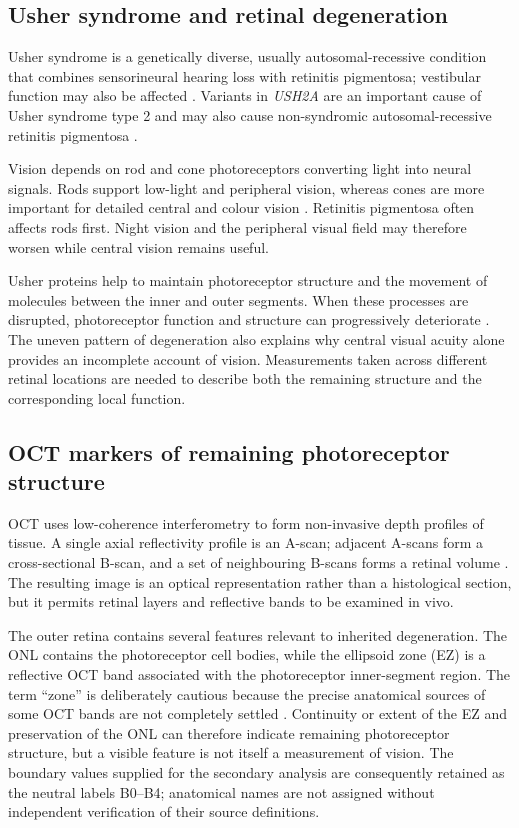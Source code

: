 \subsection{Usher syndrome and retinal degeneration}

Usher syndrome is a genetically diverse, usually autosomal-recessive condition that combines sensorineural hearing loss with retinitis pigmentosa; vestibular function may also be affected \cite{Mathur2015,Whatley2020}. Variants in \textit{USH2A} are an important cause of Usher syndrome type 2 and may also cause non-syndromic autosomal-recessive retinitis pigmentosa \cite{Toualbi2020,Lad2022}.

Vision depends on rod and cone photoreceptors converting light into neural signals. Rods support low-light and peripheral vision, whereas cones are more important for detailed central and colour vision \cite{Salesse2017}. Retinitis pigmentosa often affects rods first. Night vision and the peripheral visual field may therefore worsen while central vision remains useful.

Usher proteins help to maintain photoreceptor structure and the movement of molecules between the inner and outer segments. When these processes are disrupted, photoreceptor function and structure can progressively deteriorate \cite{Whatley2020,Mathur2015}. The uneven pattern of degeneration also explains why central visual acuity alone provides an incomplete account of vision. Measurements taken across different retinal locations are needed to describe both the remaining structure and the corresponding local function.

\subsection{OCT markers of remaining photoreceptor structure}

OCT uses low-coherence interferometry to form non-invasive depth profiles of tissue. A single axial reflectivity profile is an A-scan; adjacent A-scans form a cross-sectional B-scan, and a set of neighbouring B-scans forms a retinal volume \cite{Huang1991,Langlo2025}. The resulting image is an optical representation rather than a histological section, but it permits retinal layers and reflective bands to be examined in vivo.

The outer retina contains several features relevant to inherited degeneration. The ONL contains the photoreceptor cell bodies, while the ellipsoid zone (EZ) is a reflective OCT band associated with the photoreceptor inner-segment region. The term ``zone'' is deliberately cautious because the precise anatomical sources of some OCT bands are not completely settled \cite{Staurenghi2014,Tao2016}. Continuity or extent of the EZ and preservation of the ONL can therefore indicate remaining photoreceptor structure, but a visible feature is not itself a measurement of vision. The boundary values supplied for the secondary analysis are consequently retained as the neutral labels B0--B4; anatomical names are not assigned without independent verification of their source definitions.

